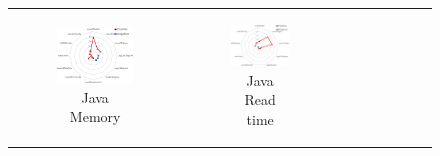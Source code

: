 \begin{figure}[tp]
\begin{center}

    \begin{tabular}{c c c}
	    \begin{subfigure}[t]{0.31\textwidth}\centering
	    \includegraphics[width=0.95\textwidth]{figures/spider-java-memory.pdf}
	    \caption{Java Memory}\end{subfigure} &
	    \begin{subfigure}[t]{0.31\textwidth}\centering
	    \includegraphics[width=0.95\textwidth]{figures/spider-java-read.pdf}
	    \caption{Java Read time}\end{subfigure} &
	    \begin{subfigure}[t]{0.31\textwidth}\centering

\end{subfigure}
\end{tabular}
\end{center}
\end{figure}
